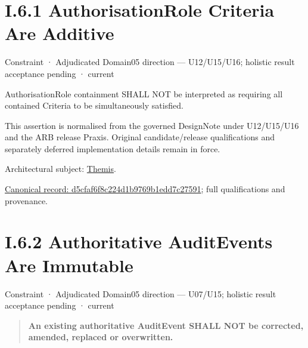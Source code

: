 \section*{I.6.1 AuthorisationRole Criteria Are Additive}
\label{navigation:I.6.1}

\label{element:d5cfaf6f8c224d1b9769b1edd7c27591}
{\small Constraint · Adjudicated Domain05 direction — U12/U15/U16; holistic result acceptance pending · current}\par

AuthorisationRole containment SHALL NOT be interpreted as requiring all contained Criteria to be simultaneously satisfied.



This assertion is normalised from the governed DesignNote under U12/U15/U16 and the ARB release Praxis. Original candidate/release qualifications and separately deferred implementation details remain in force.



Architectural subject: \hyperref[element:899d34ec491948b68aad09e507dea6d1]{Themis}.


{\footnotesize \href{../../../../../../../continuum/motivation/constraint/d5cfaf6f8c224d1b9769b1edd7c27591.md}{Canonical record: d5cfaf6f8c224d1b9769b1edd7c27591}; full qualifications and provenance.}\par
\section*{I.6.2 Authoritative AuditEvents Are Immutable}
\label{navigation:I.6.2}

\label{element:21eb20cdc600411cb71fbfe2abce4dbe}
{\small Constraint · Adjudicated Domain05 direction — U07/U15; holistic result acceptance pending · current}\par

\begin{quote}


\textbf{An existing authoritative AuditEvent SHALL NOT be corrected, amended, replaced or overwritten.}



\end{quote}


